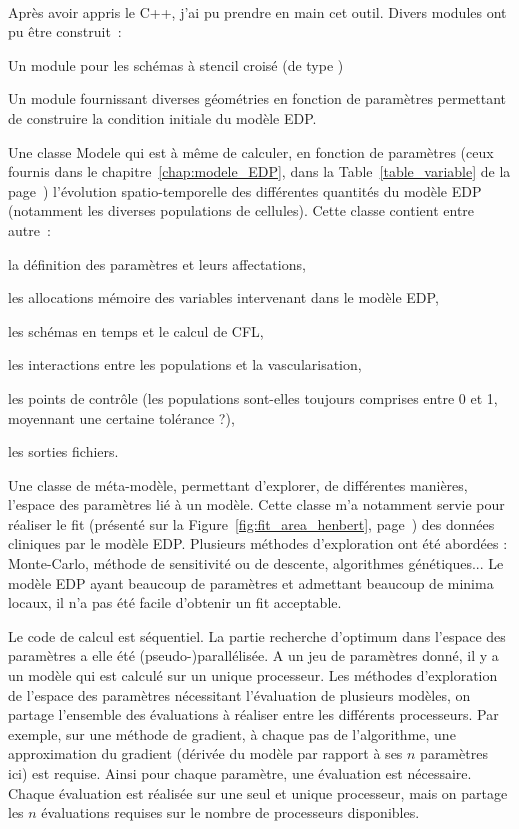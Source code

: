 \documentclass[main.tex]{subfiles}
\begin{document}
\paragraph{}
Après avoir appris le C++, j'ai pu prendre en main cet outil. Divers modules ont pu être construit~:
\begin{myitemize}
\item Un module pour les schémas à stencil croisé (de type \twinweno)
\item Un module fournissant diverses géométries en fonction de paramètres permettant de construire la condition initiale du modèle EDP.
\item Une classe Modele qui est à même de calculer, en fonction de paramètres (ceux fournis dans le chapitre~\ref{chap:modele_EDP}, dans la Table~\ref{table_variable} de la  page~\pageref{table_variable}) l'évolution spatio-temporelle des différentes quantités du modèle EDP (notamment les diverses populations de cellules). 
Cette classe contient entre autre~:
\begin{myitemize}[label=--]
\item la définition des paramètres et leurs affectations,
\item les allocations mémoire des variables intervenant dans le modèle EDP,
\item les schémas en temps et le calcul de CFL, 
\item les interactions entre les populations et la vascularisation, 
\item les points de contrôle (les populations sont-elles toujours comprises entre 0 et 1, moyennant une certaine tolérance ?),
\item les sorties fichiers.
\end{myitemize}
\item Une classe de méta-modèle, permettant d'explorer, de différentes manières, l'espace des paramètres lié à un modèle. Cette classe m'a notamment servie pour réaliser le fit (présenté sur la Figure~\ref{fig:fit_area_henbert}, page~\pageref{fig:fit_area_henbert})  des données cliniques par le modèle EDP. Plusieurs méthodes d'exploration ont été abordées : Monte-Carlo, méthode de sensitivité ou de descente, algorithmes génétiques... Le modèle EDP ayant beaucoup de paramètres et admettant beaucoup de minima locaux, il n'a pas été facile d'obtenir un fit acceptable.
\end{myitemize}


Le code de calcul est séquentiel. La partie recherche d'optimum dans l'espace des paramètres a elle été (pseudo-)parallélisée. A un jeu de paramètres donné, il y a un modèle qui est calculé sur un unique processeur. Les méthodes d'exploration de l'espace des paramètres nécessitant l'évaluation de plusieurs modèles, on partage l'ensemble des évaluations à réaliser entre les différents processeurs. Par exemple, sur une méthode de gradient, à chaque pas de l'algorithme, une approximation du gradient (dérivée du modèle par rapport à ses $n$ paramètres ici) est requise. Ainsi pour chaque paramètre, une évaluation est nécessaire. Chaque évaluation est réalisée sur une seul et unique processeur, mais on partage les $n$ évaluations requises sur le nombre de processeurs disponibles.
\end{document}
